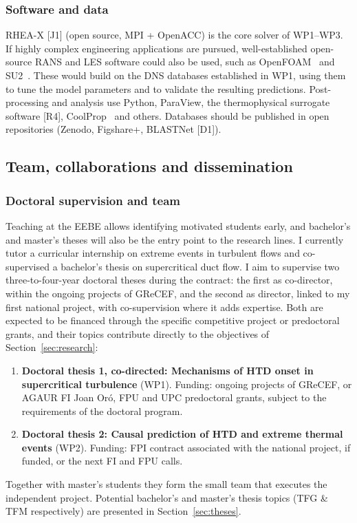 \documentclass[11pt]{article}
\begin{document}
\subsubsection{Software and data} 
RHEA-X [J1] (open source, MPI + OpenACC) is the core solver of WP1--WP3. 
If highly complex engineering applications are pursued, well-established open-source RANS and LES software could also be used, such as OpenFOAM~\cite{Weller1998} and SU2~\cite{Economon2016}. %
These would build on the DNS databases established in WP1, using them to tune the model parameters and to validate the resulting predictions.
Post-processing and analysis use Python, ParaView, the thermophysical surrogate software [R4], CoolProp~\cite{CoolProp2014} and others. 
Databases should be published in open repositories (Zenodo, Figshare+, BLASTNet [D1]).


\subsection{Team, collaborations and dissemination}\label{sec:mobility}\label{sec:dissemination}

\subsubsection{Doctoral supervision and team}
Teaching at the EEBE allows identifying motivated students early, and bachelor's and master's theses will also be the entry point to the research lines. 
I currently tutor a curricular internship on extreme events in turbulent flows and co-supervised a bachelor's thesis on supercritical duct flow. 
I aim to supervise two three-to-four-year doctoral theses during the contract: the first as co-director, within the ongoing projects of GReCEF, and the second as director, linked to my first national project, with co-supervision where it adds expertise. 
Both are expected to be financed through the specific competitive project or predoctoral grants, and their topics contribute directly to the objectives of Section~\ref{sec:research}:
\begin{enumerate}
  \item \textbf{Doctoral thesis 1, co-directed: Mechanisms of HTD onset in supercritical turbulence} (WP1). Funding: ongoing projects of GReCEF, or AGAUR FI Joan Or\'o, FPU and UPC predoctoral grants, subject to the requirements of the doctoral program.
  \item \textbf{Doctoral thesis 2: Causal prediction of HTD and extreme thermal events} (WP2). Funding: FPI contract associated with the national project, if funded, or the next FI and FPU calls.
\end{enumerate}
Together with master's students they form the small team that executes the independent project.
Potential bachelor's and master's thesis topics (TFG \& TFM respectively) are presented in Section~\ref{sec:theses}.
\end{document}
